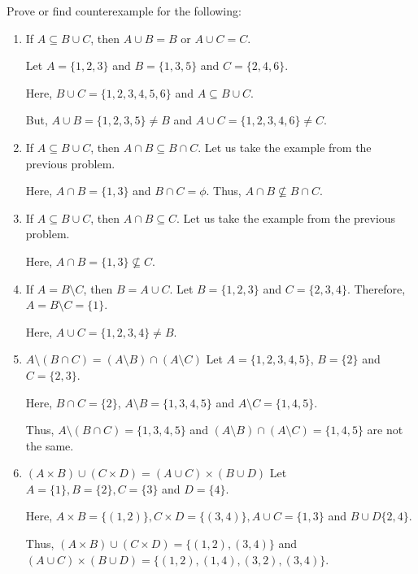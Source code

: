 \bp\label{conjectures}
	Prove or find counterexample for the following:
	\begin{enumerate}
		\item If $A \subseteq B \cup C$, then $A \cup B = B$ or $A \cup C = C$.
		
			\bs
				Let $A = \{1, 2, 3\}$ and $B = \{ 1, 3, 5 \}$ and $C = \{ 2, 4, 6 \}$.

				Here, $B \cup C = \{1, 2, 3, 4, 5, 6\}$ and $A \subseteq B \cup C$.

				But, $A \cup B = \{1, 2, 3, 5\} \neq B$ and $A \cup C = \{1, 2, 3, 4, 6\} \neq C$.
			\es
		
		\item If $A \subseteq B \cup C$, then $A \cap B \subseteq B \cap C$.
			\bs
				Let us take the example from the previous problem. 

				Here, $A \cap B = \{1, 3\}$ and $B \cap C = \phi$. Thus, $A \cap B \not\subseteq B \cap C$.
			\es

		\item If $A \subseteq B \cup C$, then $A \cap B \subseteq C$.
			\bs
				Let us take the example from the previous problem. 

				Here, $A \cap B = \{1, 3\} \not\subseteq C$.
			\es


		\item If $A = B \setminus C$, then $B = A \cup C$.
			\bs
				Let $B = \{1, 2, 3\}$ and $C = \{2, 3, 4\}$. Therefore, $A = B \setminus C = \{1\}$.

				Here, $A \cup C = \{1, 2, 3, 4\} \neq B$.
			\es


		\item $A \setminus (B \cap C) = (A \setminus B) \cap (A \setminus C)$
			\bs
				Let $A = \{1, 2, 3, 4, 5\}$, $B = \{2\}$ and $C = \{2, 3\}$.

				Here, $B \cap C = \{2\}$, $A \setminus B = \{1, 3, 4, 5\}$ and $A \setminus C = \{ 1, 4, 5 \}$.

				Thus, $A \setminus (B \cap C) = \{1, 3, 4, 5\}$ and $(A \setminus B) \cap (A \setminus C) = \{1, 4, 5\}$ are not the same.
			\es
			
		\item $(A \times B) \cup (C \times D) = (A \cup C) \times (B \cup D)$
			\bs
				Let $A = \{1\}, B = \{2\}, C = \{3\}$ and $D = \{4\}$.

				Here, $A \times B = \{(1, 2)\}, C \times D = \{(3,4)\}, 
				A \cup C = \{1, 3\}$ and $B \cup D \{2, 4\}$.

				Thus, $(A \times B) \cup (C \times D) = \{(1, 2), (3, 4)\}$ and 
				$(A \cup C) \times (B \cup D) = \{(1, 2),(1, 4), (3, 2), (3, 4)\}$.


\end{enumerate}

